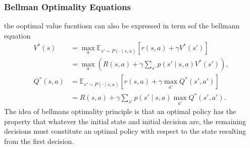 \subsubsection{Bellman Optimality Equations}
the ooptimal value fucntiosn can also be expressed in term sof the bellmann equation
\begin{align*}
    V^{*}(s) &= \max_a \mathbb{E}_{s' \sim P(\cdot \mid s,a)} \left[ r(s,a) + \gamma V^{*}(s') \right] \\
             &= \max_a \left( R(s,a) + \gamma \sum_{s'} p(s' \mid s,a) V^{*}(s') \right), \\
    Q^{*}(s,a) &= \mathbb{E}_{s' \sim P(\cdot \mid s,a)} \left[ r(s,a) + \gamma \max_{a'} Q^{*}(s',a') \right] \\
               &= R(s,a) + \gamma \sum_{s'} p(s' \mid s,a) \max_{a'} Q^{*}(s',a').
\end{align*}
The idea of bellmans optimality principle is that an optimal policy has the property that whatever the initial state and initial decision are, the remaining decisions must constitute an optimal policy with respect to the state resulting from the first decision.